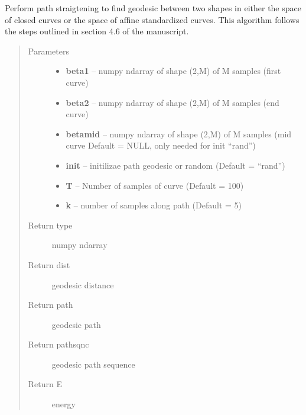 \documentclass[letterpaper,10pt,english]{sphinxmanual}
\begin{document}
\begin{fulllineitems}
\label{geodesic:geodesic.path_straightening}
Perform path straigtening to find geodesic between two shapes in either
the space of closed curves or the space of affine standardized curves.
This algorithm follows the steps outlined in section 4.6 of the
manuscript.
\begin{quote}\begin{description}
\item[{Parameters}] \leavevmode\begin{itemize}
\item {} 
\textbf{beta1} -- numpy ndarray of shape (2,M) of M samples (first curve)

\item {} 
\textbf{beta2} -- numpy ndarray of shape (2,M) of M samples (end curve)

\item {} 
\textbf{betamid} -- numpy ndarray of shape (2,M) of M samples (mid curve
Default = NULL, only needed for init ``rand'')

\item {} 
\textbf{init} -- initilizae path geodesic or random (Default = ``rand'')

\item {} 
\textbf{T} -- Number of samples of curve (Default = 100)

\item {} 
\textbf{k} -- number of samples along path (Default = 5)

\end{itemize}

\item[{Return type}] \leavevmode
numpy ndarray

\item[{Return dist}] \leavevmode
geodesic distance

\item[{Return path}] \leavevmode
geodesic path

\item[{Return pathsqnc}] \leavevmode
geodesic path sequence

\item[{Return E}] \leavevmode
energy

\end{description}\end{quote}

\end{fulllineitems}
\end{document}
